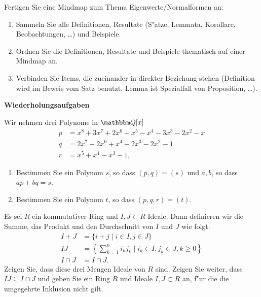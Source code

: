 \documentclass[a4,11pt]{article}
\begin{document}
\begin{aufgabe}[4 Quizbonuspunkte]
  Fertigen Sie eine Mindmap zum Thema
  Eigenwerte/Normalformen an:
  \begin{enumerate}
  \item Sammeln Sie alle Definitionen, Resultate (S"atze, Lemmata,
    Korollare, Beobachtungen, \ldots) und Beispiele.
  \item Ordnen Sie die Definitionen, Resultate und Beispiele
    thematisch auf einer Mindmap an.
  \item Verbinden Sie Items, die zueinander in direkter Beziehung
    stehen (Definition wird im Beweis vom Satz benutzt, Lemma ist
    Spezialfall von Proposition, \ldots).
  \end{enumerate}
\end{aufgabe}



\newpage
\bigskip
{\Large \bfseries Wiederholungsaufgaben}
\bigskip

\begin{aufgabe}
Wir nehmen drei Polynome in $\Q[x]$
\begin{align*}
p &= x^8 + 3x^7 + 2x^6 + x^5 - x^4 - 3x^3 - 2x^2 - x\\
q &= 2x^7 + 2x^6 + x^4 - 2x^3 - 2x^2 - 1\\
r &= x^5 + x^4 - x^3 - 1,
\end{align*}
\begin{enumerate}
\item
  Bestimmen Sie ein Polynom $s$, so dass $(p,q) = (s)$
  und $a,b$, so dass $ap+bq=s$.
\item
  Bestimmen Sie ein Polynom $t$, so dass $(p,q,r) = (t)$.
 \end{enumerate}
\end{aufgabe}

\begin{aufgabe}

Es sei $R$ ein kommutativer Ring und $I, J \subset R$ Ideale. Dann
definieren wir die Summe, das Produkt und den Durchschnitt von $I$ und
$J$ wie folgt.
\begin{align*}
I + J &= \{ i + j \mid i \in I, j \in J \}\\
IJ &= \left\{ \sum_{k = 1}^n i_k j_k \mid i_k \in I, j_k \in J, k \geq 0 \right\}\\
I \cap J &= I \cap J.
\end{align*}
Zeigen Sie, dass diese drei Mengen Ideale von $R$ sind. Zeigen Sie
weiter, dass $IJ \subseteq I \cap J$ und geben Sie ein Ring $R$ und
Ideale $I, J \subset R$ an, f"ur die die umgegehrte Inklusion nicht gilt.  
\end{aufgabe}
\end{document}
